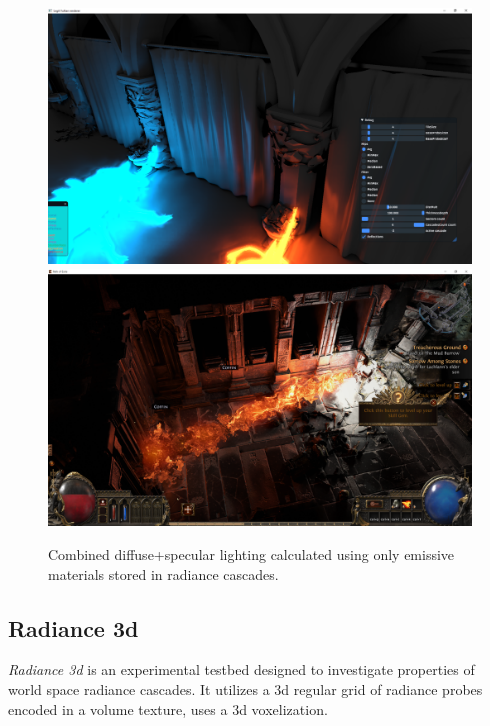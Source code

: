 \documentclass{jcgt}
\begin{document}
\begin{figure}[htb]
  \centering
  \includegraphics[width=\columnwidth]{images/radiant_specular.png}
  \includegraphics[width=\columnwidth]{images/poe2_reflections_comb.png}
  \caption{\label{fig:poe_spec_and_diff}
     Combined diffuse+specular lighting calculated using only emissive materials stored in radiance cascades.}
\end{figure}


\clearpage
\subsection{Radiance 3d}
\emph{Radiance 3d} is an experimental testbed designed to investigate properties of world space radiance cascades. It utilizes a 3d regular grid of radiance probes encoded in a volume texture, uses a 3d voxelization.
\end{document}
